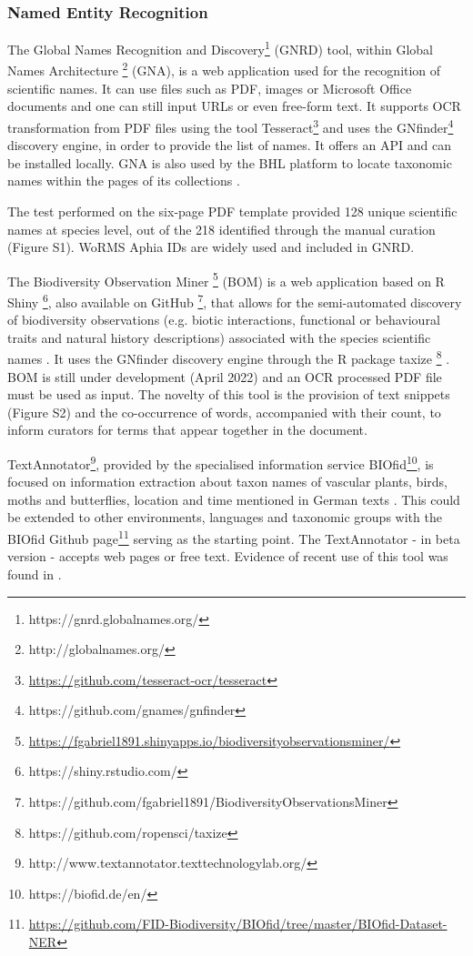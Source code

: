    \subsubsection{Named Entity Recognition}
   The Global Names Recognition and Discovery\footnote{https://gnrd.globalnames.org/}
(GNRD) tool, within Global Names Architecture
\footnote{http://globalnames.org/} (GNA), is a web application used for the
recognition of scientific names. It can use files such as PDF, images or
Microsoft Office documents and one can still input URLs or even free-form text.
It supports OCR transformation from PDF files using the tool
Tesseract\footnote{\url{https://github.com/tesseract-ocr/tesseract}} and uses
the GNfinder\footnote{https://github.com/gnames/gnfinder} discovery engine, in
order to provide the list of names. It offers an API and can be installed
locally. GNA is also used by the BHL platform to locate taxonomic names within
the pages of its collections \citep{richard_improving_2020}.

The test performed on the \citep{WoRMS:SourceID:40714} six-page PDF template
provided 128 unique scientific names at species level, out of the 218
identified through the manual curation
(Figure S1). WoRMS Aphia IDs
\citep{vandepitte_fishing_2015,martin_miguez_european_2019} are widely used and
included in GNRD.

The Biodiversity Observation Miner \footnote{\url{https://fgabriel1891.shinyapps.io/biodiversityobservationsminer/}}
(BOM) is a web application based on R Shiny \footnote{https://shiny.rstudio.com/},
also available on GitHub \footnote{https://github.com/fgabriel1891/BiodiversityObservationsMiner},
that allows for the semi-automated discovery of biodiversity observations (e.g.
biotic interactions, functional or behavioural traits and natural history
descriptions) associated with the species scientific names \citep{10.3897/BDJ.7.e28737}.
It uses the GNfinder discovery engine through the R package
taxize \footnote{https://github.com/ropensci/taxize} \citep{chamberlain_taxize_2013}.
BOM is still under development (April 2022) and an OCR processed PDF file must
be used as input. The novelty of this tool is the provision of text snippets
(Figure S2) and the co-occurrence of words, accompanied
with their count, to inform curators for terms that appear together in the
document.

TextAnnotator\footnote{http://www.textannotator.texttechnologylab.org/},
provided by the specialised information service BIOfid\footnote{https://biofid.de/en/},
is focused on information extraction about taxon names of vascular plants,
birds, moths and butterflies, location and time mentioned in German texts
\citep{driller_workflow_2018,driller_fast_2020}. This could be extended to
other environments, languages and taxonomic groups with the BIOfid Github
page\footnote{\url{https://github.com/FID-Biodiversity/BIOfid/tree/master/BIOfid-Dataset-NER}}
serving as the starting point. The TextAnnotator - in beta version - accepts
web pages or free text. Evidence of recent use of this tool was found in \citep{driller_fast_2020}.

